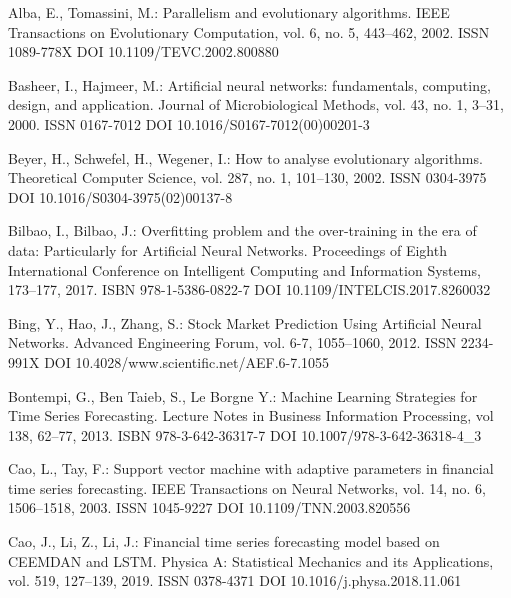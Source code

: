 
\begin{thebibliography}{99.}

 Alba, E., Tomassini, M.: Parallelism and evolutionary algorithms. IEEE Transactions on Evolutionary Computation, vol. 6, no. 5, 443--462, 2002. ISSN 1089-778X DOI 10.1109/TEVC.2002.800880

 Basheer, I., Hajmeer, M.: Artificial neural networks: fundamentals, computing, design, and application. Journal of Microbiological Methods, vol. 43, no. 1, 3--31, 2000. ISSN 0167-7012 DOI 10.1016/S0167-7012(00)00201-3

 Beyer, H., Schwefel, H., Wegener, I.: How to analyse evolutionary algorithms. Theoretical Computer Science, vol. 287, no. 1, 101--130, 2002. ISSN 0304-3975 DOI 10.1016/S0304-3975(02)00137-8

 Bilbao, I., Bilbao, J.: Overfitting problem and the over-training in the era of data: Particularly for Artificial Neural Networks. Proceedings of Eighth International Conference on Intelligent Computing and Information Systems, 173--177, 2017. ISBN 978-1-5386-0822-7 DOI 10.1109/INTELCIS.2017.8260032

 Bing, Y., Hao, J., Zhang, S.: Stock Market Prediction Using Artificial Neural Networks. Advanced Engineering Forum, vol. 6-7, 1055--1060, 2012. ISSN 2234-991X DOI 10.4028/www.scientific.net/AEF.6-7.1055

 Bontempi, G., Ben Taieb, S., Le Borgne Y.: Machine Learning Strategies for Time Series Forecasting. Lecture Notes in Business Information Processing, vol 138, 62--77, 2013. ISBN 978-3-642-36317-7 DOI 10.1007/978-3-642-36318-4\_3

 Cao, L., Tay, F.: Support vector machine with adaptive parameters in financial time series forecasting. IEEE Transactions on Neural Networks, vol. 14, no. 6, 1506--1518, 2003. ISSN 1045-9227 DOI 10.1109/TNN.2003.820556

 Cao, J., Li, Z., Li, J.: Financial time series forecasting model based on CEEMDAN and LSTM. Physica A: Statistical Mechanics and its Applications, vol. 519, 127--139, 2019. ISSN 0378-4371 DOI 10.1016/j.physa.2018.11.061


\end{thebibliography}
